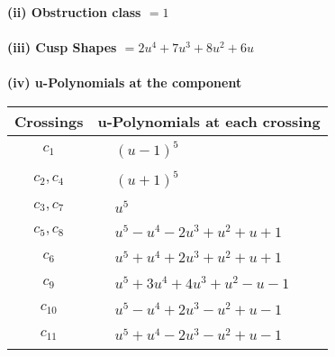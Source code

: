\documentclass[1p]{elsarticle_modified}
\theoremstyle{definition}
\begin{document}
\flushleft \textbf{(ii) Obstruction class $= 1$}\\~\\
\flushleft \textbf{(iii) Cusp Shapes $= 2 u^4+7 u^3+8 u^2+6 u$}\\~\\
\newpage\renewcommand{\arraystretch}{1}
\flushleft \textbf{(iv) u-Polynomials at the component}\newline \\
\begin{tabular}{m{50pt}|m{274pt}}
Crossings & \hspace{64pt}u-Polynomials at each crossing \\
\hline $$\begin{aligned}c_{1}\end{aligned}$$&$\begin{aligned}
&(u-1)^5
\end{aligned}$\\
\hline $$\begin{aligned}c_{2},c_{4}\end{aligned}$$&$\begin{aligned}
&(u+1)^5
\end{aligned}$\\
\hline $$\begin{aligned}c_{3},c_{7}\end{aligned}$$&$\begin{aligned}
&u^5
\end{aligned}$\\
\hline $$\begin{aligned}c_{5},c_{8}\end{aligned}$$&$\begin{aligned}
&u^5- u^4-2 u^3+u^2+u+1
\end{aligned}$\\
\hline $$\begin{aligned}c_{6}\end{aligned}$$&$\begin{aligned}
&u^5+u^4+2 u^3+u^2+u+1
\end{aligned}$\\
\hline $$\begin{aligned}c_{9}\end{aligned}$$&$\begin{aligned}
&u^5+3 u^4+4 u^3+u^2- u-1
\end{aligned}$\\
\hline $$\begin{aligned}c_{10}\end{aligned}$$&$\begin{aligned}
&u^5- u^4+2 u^3- u^2+u-1
\end{aligned}$\\
\hline $$\begin{aligned}c_{11}\end{aligned}$$&$\begin{aligned}
&u^5+u^4-2 u^3- u^2+u-1
\end{aligned}$\\
\hline
\end{tabular}\\~\\
\end{document}
